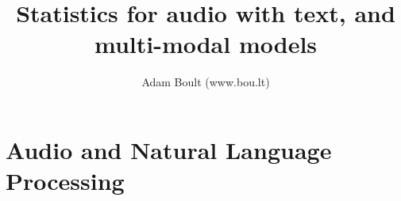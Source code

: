 \documentclass[oneside]{book}
\begin{document}
\author{Adam Boult (www.bou.lt)}
\title{Statistics for audio with text, and multi-modal models}
\maketitle

\setcounter{tocdepth}{0}
\tableofcontents



\part{Audio and Natural Language Processing}



\end{document}
